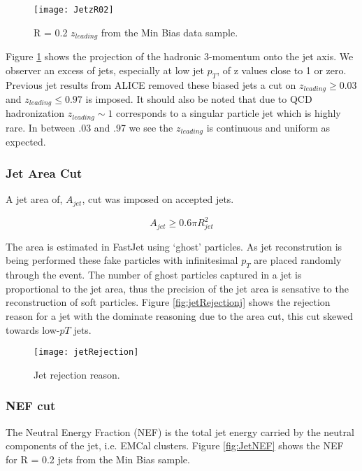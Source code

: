 \begin{figure}[h]
\texttt{[image: JetzR02]}
\centering
\caption{R = 0.2 $z_{leading}$ from the Min Bias data sample.}
\label{fig:Jetz}
\end{figure}

\noindent
Figure \ref{fig:Jetz} shows the projection of the hadronic 3-momentum onto the jet axis.  We observer an excess of jets, especially at low jet $p_{T}$, of z values close to 1 or zero.  Previous jet results from ALICE removed these biased jets a cut on $ z_{leading} \geq 0.03$ and $z_{leading} \leq 0.97$ is imposed.  It should also be noted that due to QCD hadronization $z_{leading} \sim 1$ corresponds to a singular particle jet which is highly rare.  In between .03 and .97 we see the $z_{leading}$ is continuous and uniform as expected.  

\subsubsection{Jet Area Cut}

A jet area of, $A_{jet}$, cut was imposed on accepted jets.

\begin{equation}
A_{jet} \geq 0.6 \pi R_{jet}^{2}
\label{eq:AreaJet}
\end{equation}

The area is estimated in FastJet using `ghost' particles.  As jet reconstrution is being performed these fake particles with infinitesimal $p_{T}$ are placed randomly through the event.  The number of ghost particles captured in a jet is proportional to the jet area, thus the precision of the jet area is sensative to the reconstruction of soft particles.  Figure \ref{fig:jetRejectionj} shows the rejection reason for a jet with the dominate reasoning due to the area cut, this cut skewed towards low-$p{T}$ jets.

\begin{figure}[h]
\texttt{[image: jetRejection]}
\centering
\caption{Jet rejection reason.}
\label{fig:jetRejection}
\end{figure}

\subsubsection{NEF cut}
The Neutral Energy Fraction (NEF) is the total jet energy carried by the neutral components of the jet, i.e. EMCal clusters.  Figure \ref{fig:JetNEF} shows the NEF for R = 0.2 jets from the Min Bias sample.

